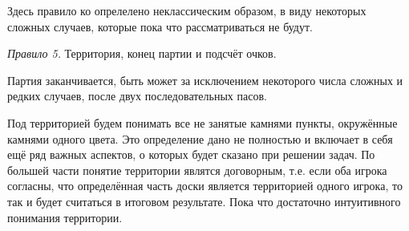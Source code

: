 \documentclass[14pt,a4paper]{extarticle}
\begin{document}
Здесь правило ко опрелелено неклассическим образом, в виду некоторых сложных случаев, которые пока что рассматриваться не будут.

\textit{Правило 5.} Территория, конец партии и подсчёт очков.

Партия заканчивается, быть может за исключением некоторого числа сложных и редких случаев, после двух последовательных пасов.

Под территорией будем понимать все не занятые камнями пункты, окружённые камнями одного цвета. Это определение дано не полностью и включает в себя ещё ряд важных аспектов, о которых будет сказано при решении задач. По большей части понятие территории являтся договорным, т.е. если оба игрока согласны, что определённая часть доски является территорией одного игрока, то так и будет считаться в итоговом результате. Пока что достаточно интуитивного понимания территории.
\end{document}
